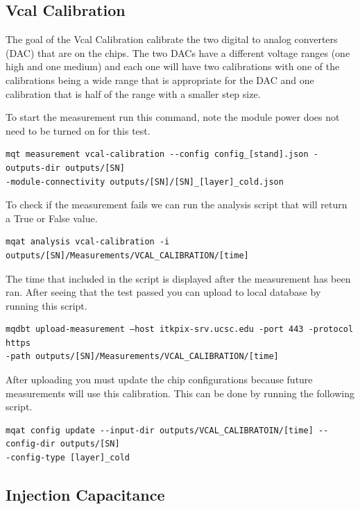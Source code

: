 \documentclass[12pt]{article}
\begin{document}
\subsection{Vcal Calibration}

The goal of the Vcal Calibration calibrate the two digital to analog converters (DAC) that are on the chips. The two DACs have a different voltage ranges (one high and one medium) and each one will have two calibrations with one of the calibrations being a wide range that is appropriate for the DAC and one calibration that is half of the range with a smaller step size.

To start the measurement run this command, note the module power does not need to be turned on for this test.

\begin{verbatim}
mqt measurement vcal-calibration --config config_[stand].json -outputs-dir outputs/[SN]
-module-connectivity outputs/[SN]/[SN]_[layer]_cold.json
\end{verbatim}

To check if the measurement fails we can run the analysis script that will return a True or False value. 
\begin{verbatim}
mqat analysis vcal-calibration -i outputs/[SN]/Measurements/VCAL_CALIBRATION/[time]
\end{verbatim}

The time that included in the script is displayed after the measurement has been ran. After seeing that the test passed you can upload to local database by running this script. 

\begin{verbatim}
mqdbt upload-measurement –host itkpix-srv.ucsc.edu -port 443 -protocol https
-path outputs/[SN]/Measurements/VCAL_CALIBRATION/[time]
\end{verbatim}

After uploading you must update the chip configurations because future measurements will use this calibration. This can be done by running the following script. 
\begin{verbatim}
mqat config update --input-dir outputs/VCAL_CALIBRATOIN/[time] --config-dir outputs/[SN] 
-config-type [layer]_cold
\end{verbatim}

\subsection{Injection Capacitance}
\end{document}
